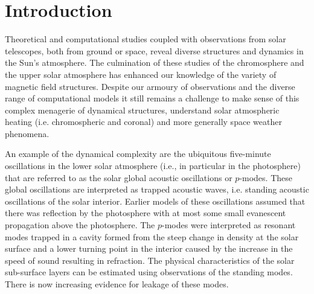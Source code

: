 \documentclass[physics,article,submit,pdftex,moreauthors]{Definitions/mdpi}
\begin{document}

\section{Introduction}

Theoretical and computational studies coupled with observations from solar telescopes,  both from ground or space, reveal diverse structures and dynamics in the Sun's atmosphere. The culmination of these studies of the  chromosphere and the upper solar atmosphere has enhanced our knowledge of the variety of magnetic field structures.  Despite our armoury of observations and the diverse range of computational models it still remains a challenge to make sense of this complex menagerie of dynamical structures, understand solar atmospheric heating (i.e. chromospheric and coronal) and more generally space weather phenomena.


An example of the dynamical complexity are the ubiquitous five-minute oscillations in the  lower solar atmosphere  (i.e., in particular in the photosphere) that are referred to as the solar global acoustic oscillations or $p$-modes. These global oscillations are interpreted as trapped acoustic waves, i.e. standing acoustic oscillations of the solar interior. Earlier models of these oscillations assumed that there was reflection by the photosphere with at most some small evanescent propagation above the photosphere. The $p$-modes were interpreted as resonant modes trapped in a cavity formed from the steep change in density at the solar surface and a lower turning point in the interior caused by the increase in the speed of sound resulting in refraction. The physical characteristics of the solar sub-surface layers can be estimated using observations of the standing modes.  There is now increasing evidence for leakage of these modes. %

   
\end{document}
